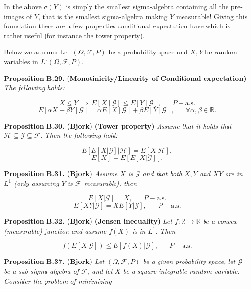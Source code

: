 \documentclass[
]{book}
\begin{document}
In the above \(\sigma(Y)\) is simply the smallest sigma-algebra containing all the pre-images of \(Y\), that is the smallest sigma-algebra making \(Y\) measurable! Giving this foundation there are a few properties conditional expectation have which is rather useful (for instance the tower property).

Below we assume: Let \((\Omega,\mathcal{F},P)\) be a probability space and \(X,Y\) be random variables in \(L^1(\Omega,\mathcal{F},P)\).

\textbf{Proposition B.29.} \textbf{(Monotinicity/Linearity of Conditional expectation)} \emph{The following holds:}

\[X\le Y\ \Rightarrow\ E[X\ \vert\ \mathcal{G}]\le E[Y\ \vert\ \mathcal{G}],\hspace{20pt}P-\text{a.s.}\tag{B.6}\]
\[E[\alpha X + \beta Y\ \vert\ \mathcal{G}]=\alpha E[X\ \vert\ \mathcal{G}]+ \beta E[Y\ \vert\ \mathcal{G}],\hspace{20pt}\forall \alpha,\beta\in\mathbb{R}.\tag{B.7}\]

\textbf{Proposition B.30. (Bjork)} \textbf{(Tower property)} \emph{Assume that it holds that \(\mathcal{H}\subseteq\mathcal{G}\subseteq\mathcal{F}\). Then the following hold:}

\[E[E[X\vert \mathcal{G}]\vert\mathcal{H}]=E[X\vert \mathcal{H}],\tag{B.8}\]
\[E[X]=E[E[X\vert \mathcal{G}]].\tag{B.9}\]

\textbf{Proposition B.31. (Bjork)} \emph{Assume \(X\) is \(\mathcal{G}\) and that both \(X,Y\) and \(XY\) are in \(L^1\) (only assuming \(Y\) is \(\mathcal{F}\)-measurable), then}

\[E[X\vert\mathcal{G}]=X,\hspace{20pt}P-\text{a.s.}\tag{B.11}\]
\[E[XY\vert\mathcal{G}]=XE[Y\vert\mathcal{G}],\hspace{20pt}P-\text{a.s.}\tag{B.12}\]

\textbf{Proposition B.32. (Bjork)} \textbf{(Jensen inequality)} \emph{Let \(f:\mathbb{R}\to\mathbb{R}\) be a convex (measurable) function and assume \(f(X)\) is in \(L^1\). Then}

\[f(E[X\vert\mathcal{G}])\le E[f(X)\vert\mathcal{G}],\hspace{20pt}P-\text{a.s.}\]

\textbf{Proposition B.37. (Bjork)} \emph{Let \((\Omega,\mathcal{F},P)\) be a given probability space, let \(\mathcal{G}\) be a sub-sigma-algebra of \(\mathcal{F}\), and let \(X\) be a square integrable random variable.
Consider the problem of minimizing}
\end{document}
